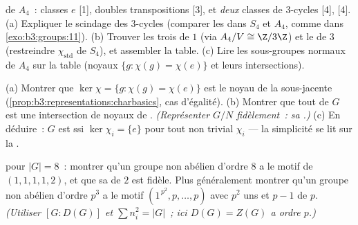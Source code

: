 \begin{exercise}[$\star\star$]\label{exo:b3:representations:5}
 de $A_4$~: classes $e$ [1], doubles
transpositions [3], et \emph{deux} classes de $3$-cycles [4],
[4].
(a) Expliquer le scindage des $3$-cycles (comparer les
 dans $S_4$ et $A_4$, comme dans
\cref{exo:b3:groups:11}).
(b) Trouver les trois  de  $1$ (via $A_4/V \cong
\Z/3\Z$) et le  de  $3$ (restreindre
$\chi_{\mathrm{std}}$ de $S_4$), et assembler la table.
(c) Lire les sous-groupes normaux de $A_4$ sur la table (noyaux
$\{g : \chi(g) = \chi(e)\}$ et leurs intersections).
\end{exercise}

\begin{exercise}[$\star\star$]\label{exo:b3:representations:6}
(a) Montrer que $\ker\chi = \{g : \chi(g) = \chi(e)\}$ est le
noyau de la  sous-jacente
(\cref{prop:b3:representations:charbasics}, cas d'égalité).
(b) Montrer que tout  de $G$ est une
intersection de noyaux de  .
\emph{(Représenter $G/N$ fidèlement~: sa .)}
(c) En déduire~: $G$ est  ssi $\ker\chi_i = \{e\}$ pour
tout  non trivial $\chi_i$ --- la simplicité se lit
sur la .
\end{exercise}

\begin{exercise}[$\star\star$]\label{exo:b3:representations:7}
 pour $|G| = 8$~: montrer qu'un groupe non abélien d'ordre
$8$ a le motif de  $(1,1,1,1,2)$, et que sa 
de  $2$ est fidèle. Plus généralement montrer qu'un groupe
non abélien d'ordre $p^3$ a le motif $(1^{\,p^2}, p, \dots, p)$
avec $p^2$ uns et $p - 1$  de  $p$.
\emph{(Utiliser $[G : D(G)]$ et $\sum n_i^2 = |G|$~; ici $D(G)
= Z(G)$ a ordre $p$.)}
\end{exercise}

